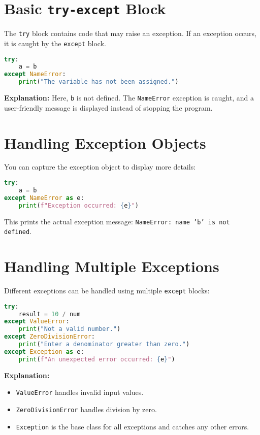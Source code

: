 \section{Basic \texttt{try-except} Block}

The \texttt{try} block contains code that may raise an exception. If an exception occurs, it is caught by the \texttt{except} block.

\begin{lstlisting}[language=Python]
try:
    a = b
except NameError:
    print("The variable has not been assigned.")
\end{lstlisting}

\textbf{Explanation:} Here, \texttt{b} is not defined. The \texttt{NameError} exception is caught, and a user-friendly message is displayed instead of stopping the program.

\section{Handling Exception Objects}

You can capture the exception object to display more details:

\begin{lstlisting}[language=Python]
try:
    a = b
except NameError as e:
    print(f"Exception occurred: {e}")
\end{lstlisting}

This prints the actual exception message: \texttt{NameError: name 'b' is not defined}.

\section{Handling Multiple Exceptions}

Different exceptions can be handled using multiple \texttt{except} blocks:

\begin{lstlisting}[language=Python]
try:
    result = 10 / num
except ValueError:
    print("Not a valid number.")
except ZeroDivisionError:
    print("Enter a denominator greater than zero.")
except Exception as e:
    print(f"An unexpected error occurred: {e}")
\end{lstlisting}

\textbf{Explanation:}  
\begin{itemize}
    \item \texttt{ValueError} handles invalid input values.
    \item \texttt{ZeroDivisionError} handles division by zero.
    \item \texttt{Exception} is the base class for all exceptions and catches any other errors.
\end{itemize}

